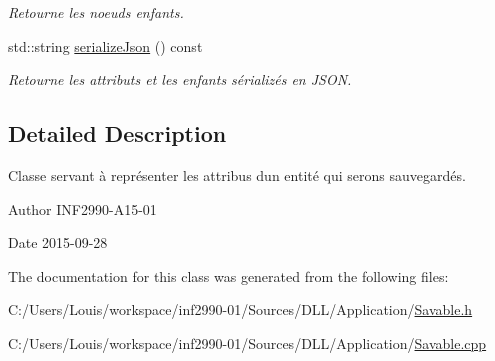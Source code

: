 \begin{DoxyCompactItemize}
\begin{DoxyCompactList}\small\item\em Retourne les noeuds enfants. \end{DoxyCompactList}\item 
std\+::string \hyperlink{group__inf2990_ga454a7c175c0864c3656283bafcb8413e}{serialize\+Json} () const 
\begin{DoxyCompactList}\small\item\em Retourne les attributs et les enfants sérializés en J\+S\+O\+N. \end{DoxyCompactList}\end{DoxyCompactItemize}


\subsection{Detailed Description}
Classe servant à représenter les attribus d\textquotesingle{}un entité qui serons sauvegardés. 

\begin{DoxyAuthor}{Author}
I\+N\+F2990-\/\+A15-\/01 
\end{DoxyAuthor}
\begin{DoxyDate}{Date}
2015-\/09-\/28 
\end{DoxyDate}


The documentation for this class was generated from the following files\+:\begin{DoxyCompactItemize}
\item 
C\+:/\+Users/\+Louis/workspace/inf2990-\/01/\+Sources/\+D\+L\+L/\+Application/\hyperlink{_savable_8h}{Savable.\+h}\item 
C\+:/\+Users/\+Louis/workspace/inf2990-\/01/\+Sources/\+D\+L\+L/\+Application/\hyperlink{_savable_8cpp}{Savable.\+cpp}\end{DoxyCompactItemize}
